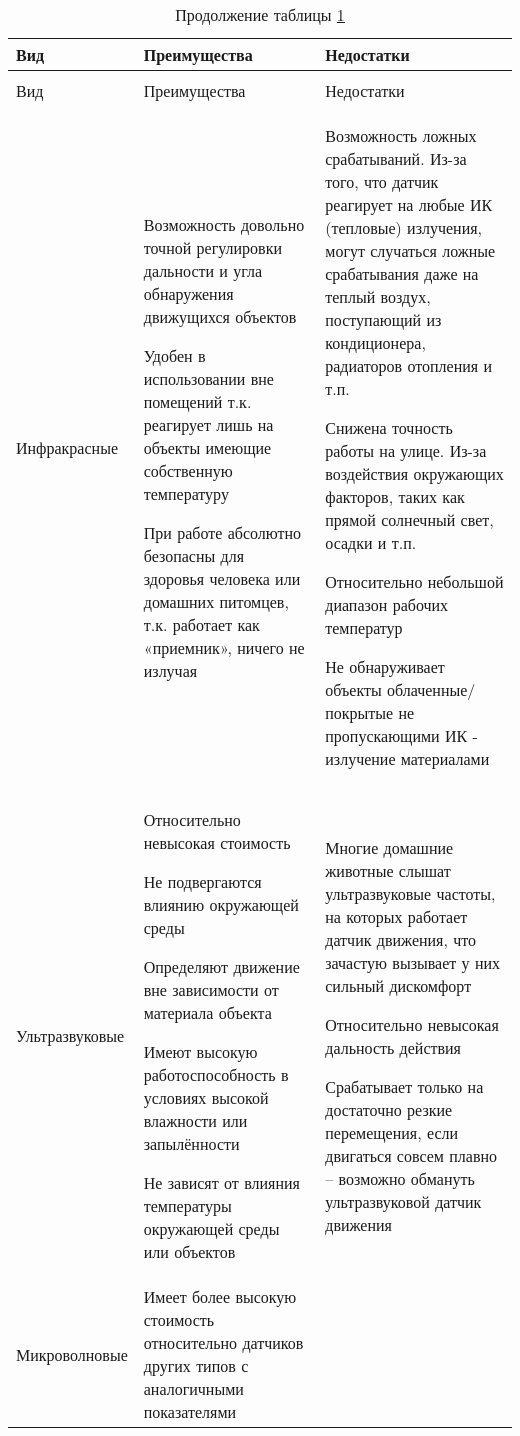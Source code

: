 {
\changefontsizes[14pt]{14pt}
\begin{longtable}[t]{@{\extracolsep{\fill}}|l|@{\hskip-14pt}p{}|@{\hskip-14pt}p{}|}
	\caption{Сравнение видов датчиков} \label{offert2} \\ \hline
	Вид & Преимущества & Недостатки \\ \hline
	\endfirsthead
	\caption* {Продолжение таблицы \ref{offert2}}\\ \hline
	Вид & Преимущества & Недостатки \\ \hline
	\endhead
	Инфракрасные	&
		Возможность довольно точной регулировки дальности и угла обнаружения движущихся объектов

		Удобен в использовании вне помещений т.к. реагирует лишь на объекты имеющие собственную температуру

		При работе абсолютно безопасны для здоровья человека или домашних питомцев, т.к. работает как «приемник», ничего не излучая
					&
		Возможность ложных срабатываний. Из-за того, что датчик реагирует на любые ИК (тепловые) излучения, могут случаться ложные срабатывания даже на теплый воздух, поступающий из кондиционера, радиаторов отопления и т.п.

		Снижена точность работы на улице. Из-за воздействия окружающих факторов, таких как прямой солнечный свет, осадки и т.п.

		Относительно небольшой диапазон рабочих температур

		Не обнаруживает объекты облаченные/покрытые не пропускающими ИК - излучение материалами
		\\ \hline
	Ультразвуковые	&
		Относительно невысокая стоимость

		Не подвергаются влиянию окружающей среды

		Определяют движение вне зависимости от материала объекта

		Имеют высокую работоспособность в условиях высокой влажности или запылённости

		Не зависят от влияния температуры окружающей среды или объектов
					&
		Многие домашние животные слышат ультразвуковые частоты, на которых работает датчик движения, что зачастую вызывает у них сильный дискомфорт

		Относительно невысокая дальность действия

		Срабатывает только на достаточно резкие перемещения, если двигаться совсем плавно – возможно обмануть ультразвуковой датчик движения
		\\ \hline
	Микроволновые	&
		Имеет более высокую стоимость относительно датчиков других типов с аналогичными показателями


\end{longtable}}
